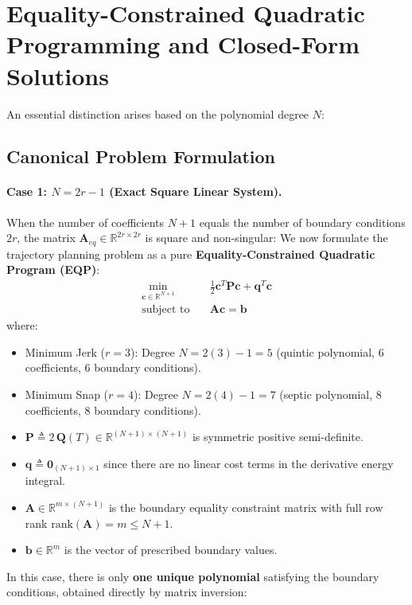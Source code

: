 \documentclass[11pt,a4paper]{article}
\begin{document}
\section{Equality-Constrained Quadratic Programming and Closed-Form Solutions}

An essential distinction arises based on the polynomial degree $N$:
\subsection{Canonical Problem Formulation}

\paragraph{Case 1: \texorpdfstring{$N = 2r - 1$}{N = 2r - 1} (Exact Square Linear System).}
When the number of coefficients $N + 1$ equals the number of boundary conditions $2r$, the matrix $\mathbf{A}_{eq} \in \mathbb{R}^{2r \times 2r}$ is square and non-singular:
We now formulate the trajectory planning problem as a pure \textbf{Equality-Constrained Quadratic Program (EQP)}:
\begin{equation}
\label{eq:eqp_standard}
\begin{aligned}
\min_{\mathbf{c} \in \mathbb{R}^{N+1}} \quad & \frac{1}{2} \mathbf{c}^T \mathbf{P} \mathbf{c} + \mathbf{q}^T \mathbf{c} \\
\text{subject to} \quad & \mathbf{A} \mathbf{c} = \mathbf{b}
\end{aligned}
\end{equation}
where:
\begin{itemize}
    \item Minimum Jerk ($r=3$): Degree $N = 2(3) - 1 = 5$ (quintic polynomial, 6 coefficients, 6 boundary conditions).
    \item Minimum Snap ($r=4$): Degree $N = 2(4) - 1 = 7$ (septic polynomial, 8 coefficients, 8 boundary conditions).
    \item $\mathbf{P} \triangleq 2 \, \mathbf{Q}(T) \in \mathbb{R}^{(N+1) \times (N+1)}$ is symmetric positive semi-definite.
    \item $\mathbf{q} \triangleq \mathbf{0}_{(N+1) \times 1}$ since there are no linear cost terms in the derivative energy integral.
    \item $\mathbf{A} \in \mathbb{R}^{m \times (N+1)}$ is the boundary equality constraint matrix with full row rank $\mathrm{rank}(\mathbf{A}) = m \le N + 1$.
    \item $\mathbf{b} \in \mathbb{R}^m$ is the vector of prescribed boundary values.
\end{itemize}
In this case, there is only \textbf{one unique polynomial} satisfying the boundary conditions, obtained directly by matrix inversion:
\end{document}
